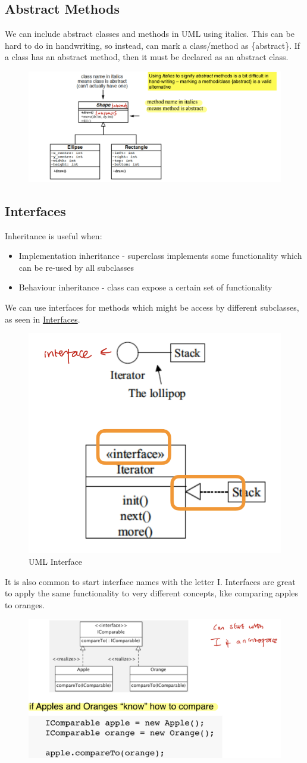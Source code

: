 \documentclass{article}
\begin{document}
\subsection{Abstract Methods}
We can include abstract classes and methods in UML using italics. This can be hard to do in handwriting, so instead, can mark a class/method as \{abstract\}. If a class has an abstract method, then it must be declared as an abstract class.
\begin{figure}[H]
\centering
\includegraphics[width = 0.6\linewidth]{Pictures/Screenshot 2023-01-27 at 12.34.03.png}
\end{figure}
\subsection{Interfaces}
Inheritance is useful when:
\begin{itemize}
    \item Implementation inheritance - superclass implements some functionality which can be re-used by all subclasses
    \item Behaviour inheritance - class can expose a certain set of functionality
\end{itemize}
We can use interfaces for methods which might be access by different subclasses, as seen in \hyperref[interface]{Interfaces}. 
\begin{figure}[H]
\centering
\includegraphics[width = 0.5\linewidth]{Pictures/Screenshot 2023-01-27 at 12.38.37.png}
\caption{UML Interface}
\end{figure}
It is also common to start interface names with the letter I. Interfaces are great to apply the same functionality to very different concepts, like comparing apples to oranges.
\begin{figure}[H]
\centering
\includegraphics[width = 0.6\linewidth]{Pictures/Screenshot 2023-01-27 at 12.40.28.png}
\end{figure}
\end{document}
